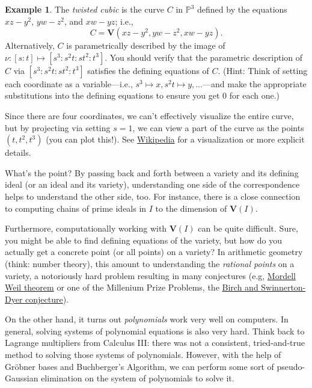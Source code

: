 \documentclass[12pt,a4paper]{article}
\newcommand{\PP}{\mathbb{P}}
\theoremstyle{definition}
\newtheorem{example}[theorem]{Example}
\numberwithin{equation}{section}
\begin{document}
\begin{example}
    The \emph{twisted cubic} is the curve $C$ in $\PP^3$ defined by the equations $xz - y^2$, $yw - z^2$, and $xw - yz$; i.e.,
    \begin{equation*}
        C = \mathbf{V}(xz - y^2, yw - z^2, xw -yz).
    \end{equation*}
    Alternatively, $C$ is parametrically described by the image of $\nu \colon [s \colon t] \mapsto [s^3 \colon s^2 t \colon s t^2 \colon t^3]$.
    You should verify that the parametric description of $C$ via $[s^3 \colon s^2 t \colon s t^2 \colon t^3]$ satisfies the defining equations of $C$.
    (Hint: Think of setting each coordinate as a variable---i.e., $s^3 \mapsto x, s^2 t \mapsto y, \dots$---and make the appropriate substitutions into the defining equations to ensure you get $0$ for each one.)

    Since there are four coordinates, we can't effectively visualize the entire curve, but by projecting via setting $s=1$, we can view a part of the curve as the points $(t, t^2, t^3)$ (you can plot this!).
    See \href{https://en.wikipedia.org/wiki/Twisted_cubic}{Wikipedia} for a visualization or more explicit details.
\end{example}


What's the point?
By passing back and forth between a variety and its defining ideal (or an ideal and its variety), understanding one side of the correspondence helps to understand the other side, too.
For instance, there is a close connection to computing chains of prime ideals in $I$ to the dimension of $\mathbf{V}(I)$.

Furthermore, computationally working with $\mathbf{V}(I)$ can be quite difficult.
Sure, you might be able to find defining equations of the variety, but how do you actually get a concrete point (or all points) on a variety?
In arithmetic geometry (think: number theory), this amount to understanding the \emph{rational points} on a variety, a notoriously hard problem resulting in many conjectures (e.g, \href{https://en.wikipedia.org/wiki/Mordell%E2%80%93Weil_theorem}{Mordell Weil theorem} or one of the Millenium Prize Problems, the \href{https://en.wikipedia.org/wiki/Birch_and_Swinnerton-Dyer_conjecture}{Birch and Swinnerton-Dyer conjecture}).

On the other hand, it turns out \emph{polynomials} work very well on computers.
In general, solving systems of polynomial equations is also very hard.
Think back to Lagrange multipliers from Calculus III: there was not a consistent, tried-and-true method to solving those systems of polynomials.
However, with the help of Gr\"obner bases and Buchberger's Algorithm, we can perform some sort of pseudo-Gaussian elimination on the system of polynomials to solve it.
\end{document}
